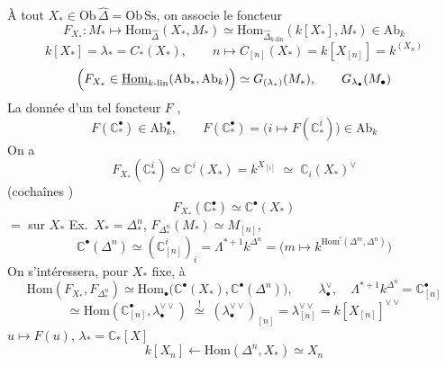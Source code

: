 \documentclass[11pt,a4paper]{article}
\begin{document}
À tout $X_* \in \mathrm{Ob}\,\hat\Delta = \mathrm{Ob}\,\mathrm{Ss}$, on associe le foncteur
\[
F_{X_*} : M_* \longmapsto \mathrm{Hom}_{\hat\Delta}(X_*,M_*) \simeq \mathrm{Hom}_{\hat\Delta_{k\text{-}\mathrm{lin}}}(k[X_*],M_*) \in \mathrm{Ab}_k
\]
\[
k[X_*] = \lambda_* = C_*(X_*), \qquad n \longmapsto C_{[n]}(X_*) = k[X_{[n]}] = k^{(X_n)}
\]
\[
\Bigl(F_{X_*} \in \underline{\mathrm{Hom}}_{k\text{-}\mathrm{lin}}(\mathrm{Ab}_*,\mathrm{Ab}_k)\Bigr) \simeq G_{(\lambda_*)}(M_*), \qquad G_{\lambda_\bullet}(M_\bullet)
\]
La donnée d'un tel foncteur $F$ , \ill{} 
\[
F(\mathbb{C}^\bullet_*) \in \mathrm{Ab}^\bullet_k, \qquad
F(\mathbb{C}^\bullet_*) = \bigl(i\mapsto F(\mathbb{C}^i_*)\bigr) \in \mathrm{Ab}_k
\]
On a
\[
F_{X_*}(\mathbb{C}^i_*) \simeq \mathbb{C}^i(X_*) = k^{X_{[i]}} \;\simeq\; \mathbb{C}_i(X_*)^\vee
\]
(cochaînes )
\[
F_{X_*}(\mathbb{C}^\bullet_*) \simeq \mathbb{C}^\bullet(X_*)
\]
$=$  sur $X_*$
Ex.\ $X_* = \Delta^n_*$, \; $F_{\Delta^n_*}(M_*) \simeq M_{[n]}$,
\[
\mathbb{C}^\bullet(\Delta^n) \simeq (\mathbb{C}^i_{[n]})_i = \Lambda^{*+1}k^{\Delta^n} = \bigl(m\mapsto k^{\mathrm{Hom}^!(\Delta^m,\Delta^n)}\bigr)
\]
On s'intéressera, pour $X_*$ fixe, à
\[
\mathrm{Hom}(F_{X_*},F_{\Delta^n_*}) \simeq \mathrm{Hom}_\bullet\bigl(\mathbb{C}^\bullet(X_*),\mathbb{C}^\bullet(\Delta^n)\bigr),
\qquad \lambda^\vee_\bullet, \quad \Lambda^{*+1}k^{\Delta^n} = \mathbb{C}^\bullet_{[n]}
\]
\[
\simeq \mathrm{Hom}(\mathbb{C}^\bullet_{[n]},\lambda^{\vee\vee}_\bullet)
\;\overset{!}{\simeq}\; (\lambda^{\vee\vee}_\bullet)_{[n]} = \lambda_{[n]}^{\vee\vee} = k[X_{[n]}]^{\vee\vee}
\]
 \quad $u \mapsto F(u)$, \quad $\lambda_* = \mathbb{C}_*[X]$
\[
k[X_n] \longleftarrow \mathrm{Hom}(\Delta^n,X_*) \simeq X_n
\]
 \ill{} \ill{} 

\end{document}
